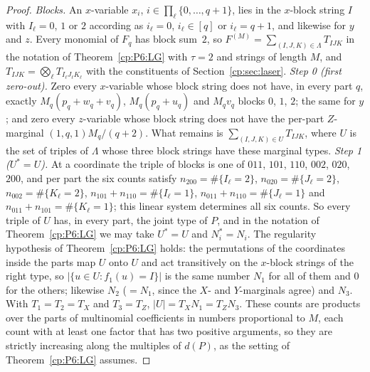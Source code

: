 \documentclass[11pt]{article}
\theoremstyle{definition}
\theoremstyle{remark}
\newcommand{\abs}[1]{\lvert #1\rvert}
\begin{document}
\begin{proof}
\emph{Blocks.} An $x$-variable $x_i$, $i\in\prod_\ell\{0,\dots,q+1\}$, lies in the $x$-block string $I$ with $I_\ell=0$, $1$ or $2$ according as $i_\ell=0$, $i_\ell\in[q]$ or $i_\ell=q+1$, and likewise for $y$ and $z$. Every monomial of $F_q$ has block sum~$2$, so $F^{(M)}=\sum_{(I,J,K)\in\Lambda}T_{IJK}$ in the notation of Theorem~\ref{cp:P6:LG} with $\tau=2$ and strings of length $M$, and $T_{IJK}=\bigotimes_\ell T_{I_\ell J_\ell K_\ell}$ with the constituents of Section~\ref{cp:sec:laser}.
\emph{Step 0 (first zero-out).} Zero every $x$-variable whose block string does not have, in every part $q$, exactly $M_q(p_q+w_q+v_q)$, $M_q(p_q+u_q)$ and $M_qv_q$ blocks $0$, $1$, $2$; the same for $y$; and zero every $z$-variable whose block string does not have the per-part $Z$-marginal $(1,q,1)M_q/(q+2)$. What remains is $\sum_{(I,J,K)\in U}T_{IJK}$, where $U$ is the set of triples of $\Lambda$ whose three block strings have these marginal types.
\emph{Step 1 ($U^*=U$).} At a coordinate the triple of blocks is one of $011$, $101$, $110$, $002$, $020$, $200$, and per part the six counts satisfy $n_{200}=\#\{I_\ell=2\}$, $n_{020}=\#\{J_\ell=2\}$, $n_{002}=\#\{K_\ell=2\}$, $n_{101}+n_{110}=\#\{I_\ell=1\}$, $n_{011}+n_{110}=\#\{J_\ell=1\}$ and $n_{011}+n_{101}=\#\{K_\ell=1\}$; this linear system determines all six counts. So every triple of $U$ has, in every part, the joint type of $P$, and in the notation of Theorem~\ref{cp:P6:LG} we may take $U^*=U$ and $N_i^*=N_i$. The regularity hypothesis of Theorem~\ref{cp:P6:LG} holds: the permutations of the coordinates inside the parts map $U$ onto $U$ and act transitively on the $x$-block strings of the right type, so $\abs{\{u\in U:f_1(u)=I\}}$ is the same number $N_1$ for all of them and $0$ for the others; likewise $N_2$ ($=N_1$, since the $X$- and $Y$-marginals agree) and $N_3$. With $T_1=T_2=T_X$ and $T_3=T_Z$, $\abs U=T_XN_1=T_ZN_3$. These counts are products over the parts of multinomial coefficients in numbers proportional to $M$, each count with at least one factor that has two positive arguments, so they are strictly increasing along the multiples of $d(P)$, as the setting of Theorem~\ref{cp:P6:LG} assumes.

\end{proof}
\end{document}
